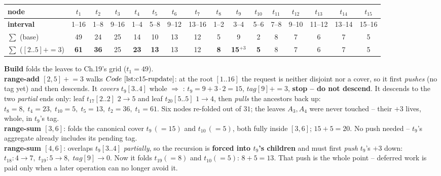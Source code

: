 \begin{center}
\scriptsize
\renewcommand{\arraystretch}{1.1}
\setlength{\tabcolsep}{3pt}
\begin{tabular}{@{}l|cccc|cccc|ccccccc@{}}
\toprule
\textbf{node} & \(t_1\)&\(t_2\)&\(t_3\)&\(t_4\) & \(t_5\)&\(t_6\)&\(t_7\)&\(t_8\) & \(t_9\)&\(t_{10}\)&\(t_{11}\)&\(t_{12}\)&\(t_{13}\)&\(t_{14}\)&\(t_{15}\)\\
\midrule
\textbf{interval} & 1--16&1--8&9--16&1--4 & 5--8&9--12&13--16&1--2 & 3--4&5--6&7--8&9--10&11--12&13--14&15--16\\
\(\sum\) (base) & 49&24&25&14 & 10&13&12&5 & 9&2&8&7&6&7&5\\
\(\sum\) (\([2..5]{+}=3\)) & \textbf{61}&\textbf{36}&25&\textbf{23} & \textbf{13}&13&12&\textbf{8} & \textbf{15$^{+3}$}&\textbf{5}&8&7&6&7&5\\
\bottomrule
\end{tabular}
\end{center}


\begin{tracebox}
\textbf{Build} folds the leaves to Ch.19's grid (\(t_1=49\)).\\
\textbf{range-add \([2,5]\mathrel{+}=3\)} walks \(\coderef{c15-rupdate}\): at the root
\([1..16]\) the request is neither disjoint nor a cover, so it first \emph{pushes}
(no tag yet) and then descends.  It \emph{covers} \(t_9[3..4]\) whole \(\Rightarrow\)
: \(t_9{=}9{+}3{\cdot}2{=}15\), \(\mathit{tag}[9]{+}=3\), \textbf{stop
-- do not descend}.  It descends to the two \emph{partial} ends only: leaf
\(t_{17}[2..2]\) \(2{\to}5\) and leaf \(t_{20}[5..5]\) \(1{\to}4\), then
\emph{pulls} the ancestors back up: \(t_8{=}8,\;t_4{=}23,\;t_{10}{=}5,\;t_5{=}13,\;
t_2{=}36,\;t_1{=}61\).  Six nodes re-folded out of \(31\); the leaves \(A_3,A_4\)
were never touched -- their \(+3\) lives, whole, in \(t_9\)'s tag.\\
\textbf{range-sum \([3,6]\)}: folds the canonical cover \(t_9\,(=15)\) and
\(t_{10}\,(=5)\), both fully inside \([3,6]\); \(15+5=\boxed{20}\).  No push
needed -- \(t_9\)'s aggregate already includes its pending tag.\\
\textbf{range-sum \([4,6]\)}: overlaps \(t_9[3..4]\) \emph{partially}, so the
recursion is \textbf{forced into \(t_9\)'s children} and must first
\emph{push} \(t_9\)'s \(+3\) down: \(t_{18}:4{\to}7,\;t_{19}:5{\to}8,\;
\mathit{tag}[9]{\to}0\).  Now it folds \(t_{19}(=8)\) and \(t_{10}(=5)\):
\(8+5=\boxed{13}\).  That push is the whole point -- deferred work is paid only
when a later operation can no longer avoid it.
\end{tracebox}

